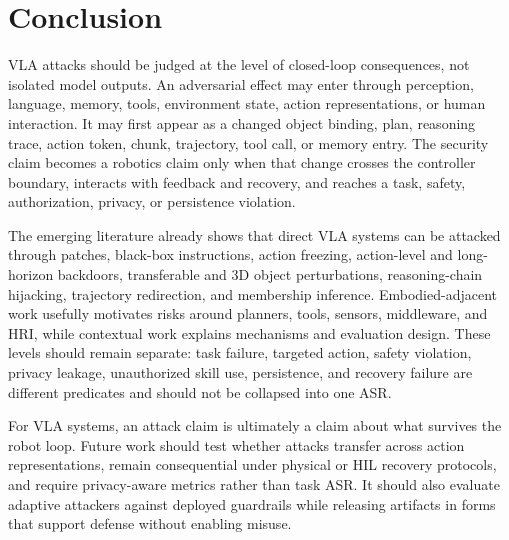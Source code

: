 \section{Conclusion}
\label{sec:conclusion}

VLA attacks should be judged at the level of closed-loop consequences, not isolated model outputs. An adversarial effect may enter through perception, language, memory, tools, environment state, action representations, or human interaction. It may first appear as a changed object binding, plan, reasoning trace, action token, chunk, trajectory, tool call, or memory entry. The security claim becomes a robotics claim only when that change crosses the controller boundary, interacts with feedback and recovery, and reaches a task, safety, authorization, privacy, or persistence violation.

The emerging literature already shows that direct VLA systems can be attacked through patches, black-box instructions, action freezing, action-level and long-horizon backdoors, transferable and 3D object perturbations, reasoning-chain hijacking, trajectory redirection, and membership inference. Embodied-adjacent work usefully motivates risks around planners, tools, sensors, middleware, and HRI, while contextual work explains mechanisms and evaluation design. These levels should remain separate: task failure, targeted action, safety violation, privacy leakage, unauthorized skill use, persistence, and recovery failure are different predicates and should not be collapsed into one ASR.

For VLA systems, an attack claim is ultimately a claim about what survives the robot loop. Future work should test whether attacks transfer across action representations, remain consequential under physical or HIL recovery protocols, and require privacy-aware metrics rather than task ASR. It should also evaluate adaptive attackers against deployed guardrails while releasing artifacts in forms that support defense without enabling misuse.

